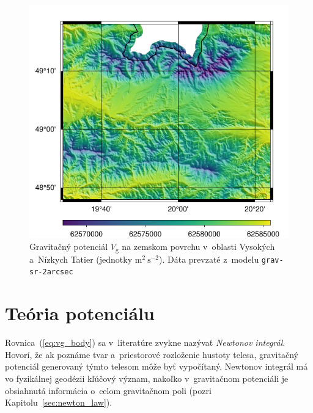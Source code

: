 \documentclass[a4paper, 12pt]{book}
\newcommand{\gidx}{\mathrm g}
\begin{document}
\begin{figure}
\centering
\includegraphics{./fig-vg-grav-sr-2arcsec.pdf}
\caption{Gravitačný potenciál $V_\gidx$ na zemskom povrchu v~oblasti Vysokých 
a~Nízkych Tatier (jednotky $\mathrm{m}^2 \ \mathrm{s}^{-2}$).  Dáta prevzaté 
z~modelu \texttt{grav-sr-2arcsec} \citep{GravSR2arcsec}}
\label{fig:vg_grav_sr_2arcsec}
\end{figure}






\section{Teória potenciálu}
\label{sec:potential_theory}

Rovnica~(\ref{eq:vg_body}) sa v~literatúre zvykne nazývať \emph{Newtonov 
integrál}.  Hovorí, že ak poznáme tvar a~priestorové rozloženie hustoty telesa, 
gravitačný potenciál generovaný týmto telesom môže byť vypočítaný.  Newtonov 
integrál má vo fyzikálnej geodézii kľúčový význam, nakoľko v~gravitačnom 
potenciáli je obsiahnutá informácia o~celom gravitačnom poli (pozri 
Kapitolu~\ref{sec:newton_law}).
\end{document}
